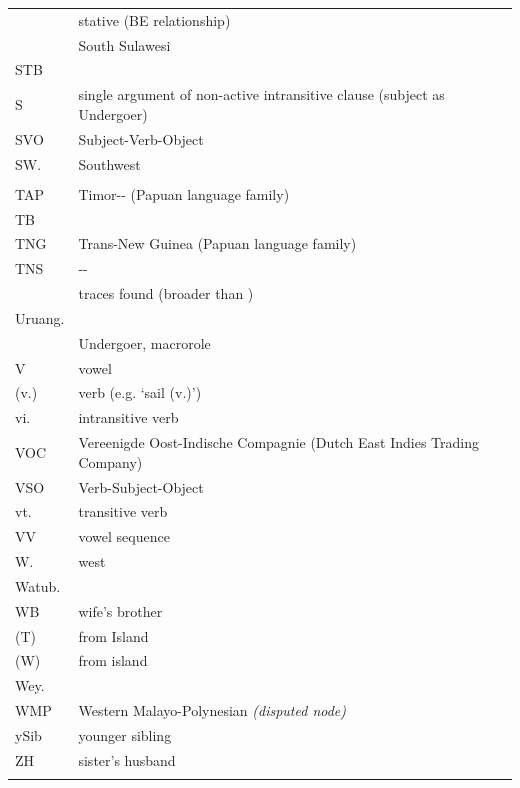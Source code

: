 {\begin{xltabular}{\textwidth}[l]{l>{\raggedright\arraybackslash}X}
	&	stative (BE relationship)	\\
	&	South Sulawesi	\\
STB	&		\\
S	&	single argument of non-active intransitive clause (subject as Undergoer)	\\
SVO	&	Subject-Verb-Object	\\
SW.	&	Southwest	\\
	&		\\
TAP	&	Timor-- (Papuan language family)	\\
TB	&		\\
TNG	&	Trans-New Guinea (Papuan language family)	\\
TNS	&	--	\\
	&	traces found (broader than )	\\
Uruang.	&		\\
	&	Undergoer, macrorole	\\
V	&	vowel	\\
(v.)	&	verb (e.g. `sail (v.)')	\\
vi.	&	intransitive verb	\\
VOC	&	Vereenigde Oost-Indische Compagnie (Dutch East Indies Trading Company)	\\
VSO	&	Verb-Subject-Object	\\
vt.	&	transitive verb	\\
VV	&	vowel sequence	\\
W.	&	west	\\
Watub.	&		\\
WB	&	wife’s brother	\\
 (T)	&	 from  Island	\\
 (W)	&	 from  island	\\
Wey.	&		\\
WMP	&	Western Malayo-Polynesian \it{(disputed node)}	\\
ySib	&	younger sibling	\\
ZH	&	sister’s husband	\\
	\lspbottomrule
\end{xltabular}}